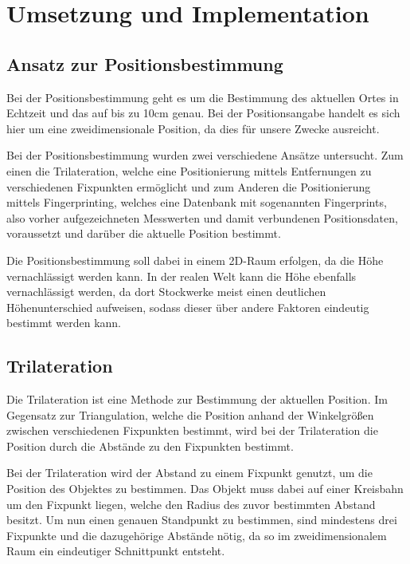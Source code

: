 \chapter{Umsetzung und Implementation}
\label{chap:implementation}

\section{Ansatz zur Positionsbestimmung}
\label{sec:implementation:positioning}
Bei der Positionsbestimmung geht es um die Bestimmung des aktuellen Ortes in Echtzeit und das auf bis zu 10cm genau. Bei der Positionsangabe handelt es sich hier um eine zweidimensionale Position, da dies für unsere Zwecke ausreicht.

Bei der Positionsbestimmung wurden zwei verschiedene Ansätze untersucht. Zum einen die Trilateration, welche eine Positionierung mittels Entfernungen zu verschiedenen Fixpunkten ermöglicht und zum Anderen die Positionierung mittels Fingerprinting, welches eine Datenbank mit sogenannten Fingerprints, also vorher aufgezeichneten Messwerten und damit verbundenen Positionsdaten, voraussetzt und darüber die aktuelle Position bestimmt.

Die Positionsbestimmung soll dabei in einem 2D-Raum erfolgen, da die Höhe vernachlässigt werden kann. In der realen Welt kann die Höhe ebenfalls vernachlässigt werden, da dort Stockwerke meist einen deutlichen Höhenunterschied aufweisen, sodass dieser über andere Faktoren eindeutig bestimmt werden kann.


\section{Trilateration}
\label{sec:implementation:trilateration}
Die Trilateration ist eine Methode zur Bestimmung der aktuellen Position. Im Gegensatz zur Triangulation, welche die Position anhand der Winkelgrößen zwischen verschiedenen Fixpunkten bestimmt, wird bei der Trilateration die Position durch die Abstände zu den Fixpunkten bestimmt. 

Bei der Trilateration wird der Abstand zu einem Fixpunkt genutzt, um die Position des Objektes zu bestimmen. Das Objekt muss dabei auf einer Kreisbahn um den Fixpunkt liegen, welche den Radius des zuvor bestimmten Abstand besitzt. Um nun einen genauen Standpunkt zu bestimmen, sind mindestens drei Fixpunkte und die dazugehörige Abstände nötig, da so im zweidimensionalem Raum ein eindeutiger Schnittpunkt entsteht.

